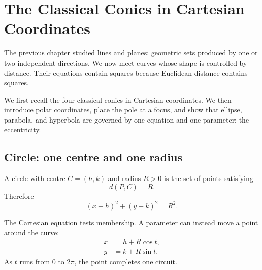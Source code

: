 \section{The Classical Conics in Cartesian Coordinates}

The previous chapter studied lines and planes: geometric sets produced by one or
two independent directions. We now meet curves whose shape is controlled by
distance. Their equations contain squares because Euclidean distance contains
squares.

\begin{corebox}
We first recall the four classical conics in Cartesian coordinates. We then
introduce polar coordinates, place the pole at a focus, and show that ellipse,
parabola, and hyperbola are governed by one equation and one parameter: the
eccentricity.
\end{corebox}

\subsection{Circle: one centre and one radius}

A circle with centre $C=(h,k)$ and radius $R>0$ is the set of points satisfying
\[
d(P,C)=R.
\]
Therefore
\[
\boxed{(x-h)^2+(y-k)^2=R^2}.
\]

\begin{center}
\end{center}

\begin{interpretationbox}
The Cartesian equation tests membership. A parameter can instead move a point
around the curve:
\[
\boxed{
\begin{aligned}
x&=h+R\cos t,\\
y&=k+R\sin t.
\end{aligned}}
\]
As $t$ runs from $0$ to $2\pi$, the point completes one circuit.
\end{interpretationbox}

